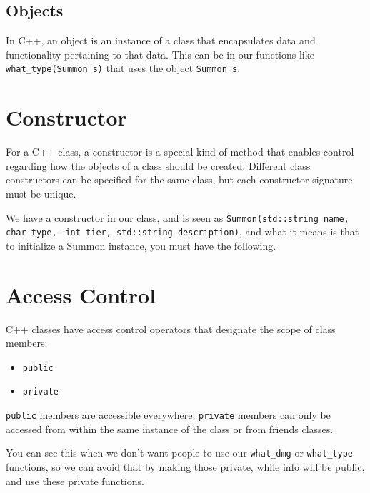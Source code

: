 \subsection{Objects}
In C++, an object is an instance of a class that encapsulates data and functionality pertaining to that data.
This can be in our functions like \verb!what_type(Summon s)! that uses the object \verb!Summon s!. 

\section{Constructor}
For a C++ class, a constructor is a special kind of method that enables control regarding how the objects of a class should be created. 
Different class constructors can be specified for the same class, but each constructor signature must be unique.

We have a constructor in our class, and is seen as \verb!Summon(std::string name, char type,! 
\verb!-int tier, std::string description)!, and 
what it means is that to initialize a Summon instance, you must have the following. 

\section{Access Control} 
C++ classes have access control operators that designate the scope of class members:

\begin{itemize}
    \item \verb!public!
    \item \verb!private!  
\end{itemize}


\verb!public! members are accessible everywhere; \verb!private! members can only be accessed from within the same instance of the class or from friends classes.

You can see this when we don't want people to use our \verb!what_dmg! or \verb!what_type! functions, so we can avoid that 
by making those private, while info will be public, and use these private functions. 